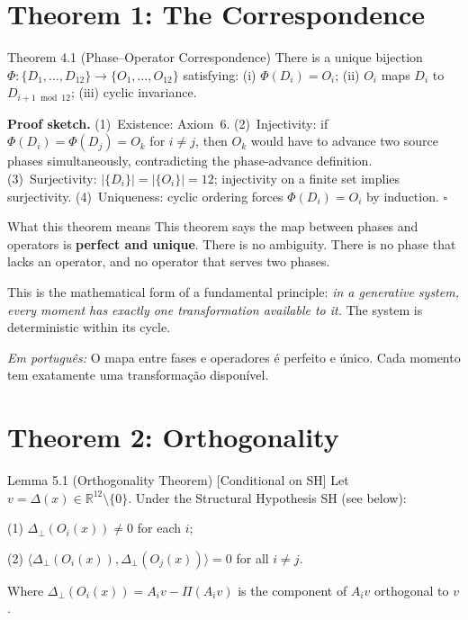 \documentclass[12pt, openright]{book}
\theoremstyle{definition}
\theoremstyle{remark}
\begin{document}
\section{Theorem 1: The Correspondence}

\begin{formalbox}{Theorem 4.1 (Phase--Operator Correspondence)}
There is a unique bijection $\Phi : \{D_1,\ldots,D_{12}\} \to
\{O_1,\ldots,O_{12}\}$ satisfying: (i) $\Phi(D_i) = O_i$;
(ii) $O_i$ maps $D_i$ to $D_{i+1 \bmod 12}$;
(iii) cyclic invariance.

\textbf{Proof sketch.}
(1)~Existence: Axiom~6.
(2)~Injectivity: if $\Phi(D_i) = \Phi(D_j) = O_k$ for $i \neq j$,
then $O_k$ would have to advance two source phases simultaneously,
contradicting the phase-advance definition.
(3)~Surjectivity: $|\{D_i\}| = |\{O_i\}| = 12$; injectivity on
a finite set implies surjectivity.
(4)~Uniqueness: cyclic ordering forces $\Phi(D_i) = O_i$ by induction. \hfill$\square$
\end{formalbox}

\begin{studentbox}{What this theorem means}
This theorem says the map between phases and operators is
\textbf{perfect and unique}. There is no ambiguity. There is
no phase that lacks an operator, and no operator that serves
two phases.

This is the mathematical form of a fundamental principle:
\textit{in a generative system, every moment has exactly one
transformation available to it.} The system is deterministic
within its cycle.

\textit{Em português:}
O mapa entre fases e operadores é perfeito e único.
Cada momento tem exatamente uma transformação disponível.
\end{studentbox}

\section{Theorem 2: Orthogonality}

\begin{formalbox}{Lemma 5.1 (Orthogonality Theorem) [Conditional on SH]}
Let $v = \Delta(x) \in \mathbb{R}^{12} \setminus \{0\}$.
Under the Structural Hypothesis SH (see below):

(1) $\Delta_\perp(O_i(x)) \neq 0$ for each $i$;

(2) $\langle \Delta_\perp(O_i(x)), \Delta_\perp(O_j(x)) \rangle = 0$
for all $i \neq j$.

Where $\Delta_\perp(O_i(x)) = A_i v - \Pi(A_i v)$ is the
component of $A_i v$ orthogonal to $v$.
\end{formalbox}
\end{document}
